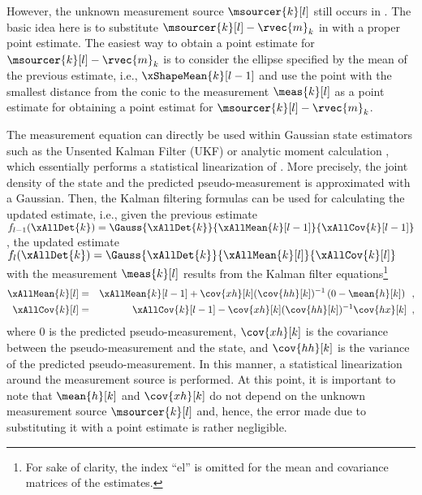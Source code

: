 \documentclass[preprint,1p,11pt]{ISAS_IR}
\begin{document}
However,   the unknown measurement source $\msourcer{k}[l]$ still occurs in .  The basic idea here is to substitute $\msourcer{k}[l]-\rvec{m}_k$   in  with a proper point estimate. The easiest way to obtain a point estimate for $\msourcer{k}[l]-\rvec{m}_k$ is to consider the  ellipse specified by the mean of the previous estimate, i.e.,  $\xShapeMean{k}[l-1]$ and use  the point with the smallest distance from the conic to the measurement $\meas{k}[l]$ as a point estimate for obtaining  a point estimat for  $\msourcer{k}[l]-\rvec{m}_k$.


The measurement equation  can  directly be used within Gaussian state estimators such as the Unsented Kalman Filter (UKF) \cite{Julier_UnscentedFiltering} or analytic moment calculation \cite{Fusion11_Baum}, which essentially performs a statistical linearization of  . More precisely,  the  joint density of the state and the predicted pseudo-measurement is approximated with a Gaussian. Then, the Kalman filtering \cite{Bar-Shalom2002} formulas can be used for calculating the updated estimate, i.e., 
given the  previous estimate $f_{l-1}(\xAllDet{k})= \Gauss{\xAllDet{k}}{\xAllMean{k}[l-1]}{\xAllCov{k}[l-1]}$, the updated estimate 
$f_{l}(\xAllDet{k})= \Gauss{\xAllDet{k}}{\xAllMean{k}[l]}{\xAllCov{k}[l]}$
 with the measurement $\meas{k}[l]$ results from the Kalman filter
equations\footnote{For sake of clarity, the index ``$\text{el}$''  is omitted for the mean and covariance matrices of the estimates.}
\begin{eqnarray}\label{eqn:update_ellipse}
 \xAllMean{k}[l]  &=&    \xAllMean{k}[l-1]    + \cov{xh}[k]  (\cov{hh}[k] )^{-1} \left(0-\mean{h}[k]  \right) \enspace ,\\
\xAllCov{k}[l] &=&   \xAllCov{k}[l-1] - \cov{xh}[k] (\cov{hh}[k] )^{-1} \cov{hx}[k] \label{eqn:update_ellipse2} \enspace ,
\end{eqnarray}
where   $0$ is the predicted pseudo-measurement, $\cov{xh}[k]$ is the  covariance between the pseudo-measurement and   the state,  and $\cov{hh}[k]$ is the variance of the predicted pseudo-measurement.
In this manner, a statistical linearization around the measurement source is performed.
 At this point, it is important to note that $\mean{h}[k]$ and  $\cov{xh}[k]$ do  not depend on the unknown measurement source $\msourcer{k}[l]$ and, hence, the error made due to substituting it with a point estimate is rather negligible.
\end{document}
